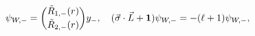 \begin{equation}
\label{2-17}
\psi_{W,-} = {\tilde R_{1,-}(r)\choose\tilde R_{2,-}(r)} y_-, \quad
(\vec \sigma \cdot \vec L + {\bf 1})\psi_{W,-} = -(\ell+1)\psi_{W,-},
\end{equation}

